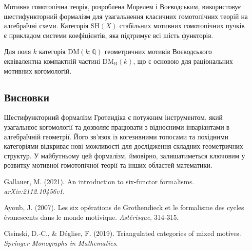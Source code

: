 \documentclass{article}
\begin{document}
Мотивна гомотопічна теорія, розроблена Морелем і Воєводським, використовує шестифункторний формалізм для узагальнення класичних гомотопічних теорій на алгебраїчні схеми. Категорія \( \mathrm{SH}(X) \) стабільних мотивних гомотопічних пучків є прикладом системи коефіцієнтів, яка підтримує всі шість функторів.

\begin{example}
Для поля \( k \) категорія \( \mathrm{DM}(k; \mathbb{Q}) \) геометричних мотивів Воєводського еквівалентна компактній частині \( \mathrm{DM}_\mathrm{B}(k) \), що є основою для раціональних мотивних когомологій.
\end{example}

\subsection{Висновки}

Шестифункторний формалізм Гротендіка є потужним інструментом, який узагальнює когомології та дозволяє працювати з відносними інваріантами в алгебраїчній геометрії. Його зв’язок із когезивними топосами та похідними категоріями відкриває нові можливості для дослідження складних геометричних структур. У майбутньому цей формалізм, ймовірно, залишатиметься ключовим у розвитку мотивної гомотопічної теорії та інших областей математики.

\begin{thebibliography}{9}
Gallauer, M. (2021). An introduction to six-functor formalisms. \textit{arXiv:2112.10456v1}.

Ayoub, J. (2007). Les six opérations de Grothendieck et le formalisme des cycles évanescents dans le monde motivique. \textit{Astérisque}, 314-315.

Cisinski, D.-C., \& Déglise, F. (2019). Triangulated categories of mixed motives. \textit{Springer Monographs in Mathematics}.
\end{thebibliography}
\end{document}
